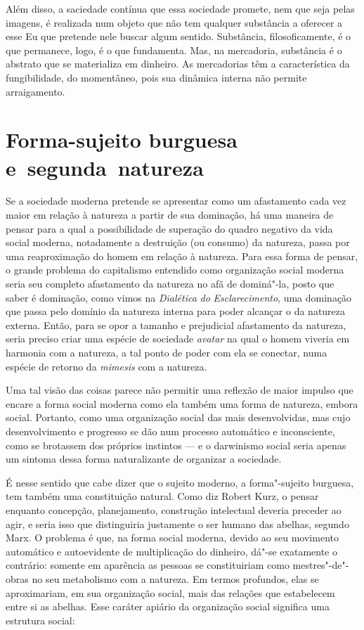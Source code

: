 Além disso, a saciedade contínua que essa sociedade promete, nem que
seja pelas imagens, é realizada num objeto que não tem qualquer
substância a oferecer a esse Eu que pretende nele buscar algum sentido.
Substância, filosoficamente, é o que permanece, logo, é o que fundamenta. Mas, na mercadoria,
substância é o abstrato que se materializa em dinheiro. As mercadorias
têm a característica da fungibilidade, do momentâneo, pois sua dinâmica
interna não permite arraigamento.

\section{Forma-sujeito burguesa e~segunda~natureza}

Se a sociedade moderna pretende se apresentar como um afastamento cada
vez maior em relação à natureza a partir de sua dominação, há uma
maneira de pensar para a qual a possibilidade de superação do quadro
negativo da vida social moderna, notadamente a destruição (ou consumo)
da natureza, passa por uma reaproximação do homem em relação à natureza.
Para essa forma de pensar, o grande problema do capitalismo entendido
como organização social moderna seria seu completo afastamento da
natureza no afã de dominá"-la, posto que saber é dominação, como vimos na
\emph{Dialética} \emph{do} \emph{Esclarecimento}, uma dominação que
passa pelo domínio da natureza interna para poder alcançar o da natureza
externa. Então, para se opor a tamanho e prejudicial afastamento da
natureza, seria preciso criar uma espécie de sociedade \emph{avatar} na
qual o homem viveria em harmonia com a natureza, a tal ponto de poder
com ela se conectar, numa espécie de retorno da \emph{mimesis} com a
natureza.

Uma tal visão das coisas parece não permitir uma reflexão de maior
impulso que encare a forma social moderna como ela também uma forma de
natureza, embora social. Portanto, como uma organização social das mais
desenvolvidas, mas cujo desenvolvimento e progresso se dão num processo
automático e inconsciente, como se brotassem dos próprios instintos --- e
o darwinismo social seria apenas um sintoma dessa forma
naturalizante de organizar a sociedade.

É nesse sentido que cabe dizer que o sujeito moderno, a forma"-sujeito
burguesa, tem também uma constituição natural. Como diz Robert Kurz, o
pensar enquanto concepção, planejamento, construção intelectual deveria
preceder ao agir, e seria isso que distinguiria justamente o ser humano
das abelhas, segundo Marx. O problema é que, na forma
social moderna, devido ao seu movimento automático e autoevidente de
multiplicação do dinheiro, dá"-se exatamente o contrário: somente em
aparência as pessoas se constituiriam como mestres"-de"-obras no seu
metabolismo com a natureza. Em termos profundos, elas se aproximariam,
em sua organização social, mais das relações que estabelecem entre si as
abelhas. Esse caráter apiário da organização social significa uma
estrutura social:

